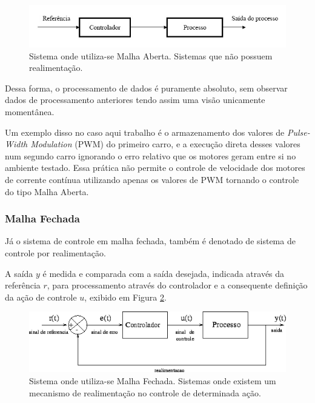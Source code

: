 \documentclass[portugues, brazil, a4paper,12pt]{article}
\begin{document}
			\begin{figure}[h]
				\centering
				\includegraphics[width=\linewidth]{img/rf-malha_aberta.jpg}
				\caption{Sistema onde utiliza-se Malha Aberta. Sistemas que não possuem realimentação.}
				\label{fig:malha_aberta}
			\end{figure}

			Dessa forma, o processamento de dados é puramente absoluto, sem observar dados de processamento anteriores tendo assim uma visão unicamente momentânea.

			Um exemplo disso no caso aqui trabalho é o armazenamento dos valores de \textit{Pulse-Width Modulation} (PWM) do primeiro carro, e a execução direta desses valores num segundo carro ignorando o erro relativo que os motores geram entre si no ambiente testado. Essa prática não permite o controle de velocidade dos motores de corrente contínua utilizando apenas os valores de PWM tornando o controle do tipo Malha Aberta.


		\subsubsection{Malha Fechada}
			Já o sistema de controle em malha fechada, também é denotado de sistema de  controle  por  realimentação.

			A  saída $ y $ é  medida e comparada com   a   saída   desejada,   indicada   através   da referência $ r $,   para processamento  através  do  controlador  e  a  consequente  definição  da  ação  de controle $ u $, exibido em Figura \ref{fig:malha_fechada}.

			\begin{figure}[h]
				\centering
				\includegraphics[width=\linewidth]{img/rf-malha_fechada.png}
				\caption{Sistema onde utiliza-se Malha Fechada. Sistemas onde existem um mecanismo de realimentação no controle de determinada ação.}
				\label{fig:malha_fechada}
			\end{figure}
\end{document}
